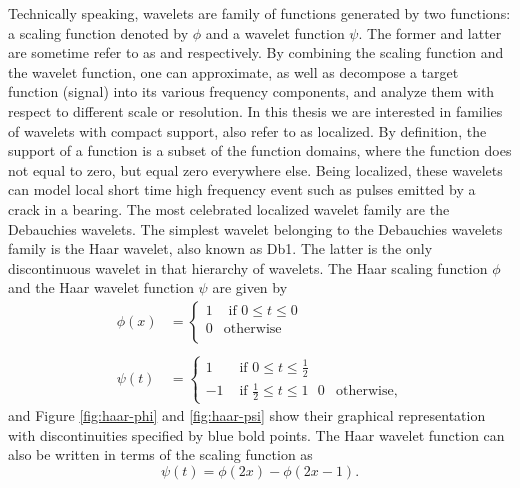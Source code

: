 \documentclass[../Main/thesis.tex]{subfiles}
\begin{document}
\justify
Technically speaking, wavelets are family of functions generated by two functions: a scaling function denoted by $\phi$ and a wavelet function $\psi$. The former and latter are sometime refer to as  and  respectively. By combining the scaling function and the wavelet function, one can approximate, as well as decompose a target function (signal) into its various frequency components, and analyze them with respect to different scale or resolution. In this thesis we are interested in families of wavelets with compact support, also refer to as localized. By definition, the support of a function is a subset of the function domain\´s, where the function does not equal to zero, but equal zero everywhere else. Being localized, these wavelets can model local short time high frequency event such as pulses emitted by a crack in a bearing. The most celebrated localized wavelet family are the Debauchies wavelets. 
\justify
The simplest wavelet belonging to the Debauchies wavelets family is the Haar wavelet, also known as Db1. The latter is the only discontinuous wavelet in that hierarchy of wavelets.
The Haar scaling function $\phi$ and the Haar wavelet function $\psi$ are given by
\begin{equation}\label{eq:haar-wavelet}
\begin{split}
\phi(x) &=
  \begin{cases}
   1 & \text{ if $0 \leq t \le 0$} \\
    0 & \text{otherwise}\\
  \end{cases}\\
  \\
\psi(t)& =
  \begin{cases}
   1 & \text{ if $0 \leq t \le \frac{1}{2}$ } \\
    -1 & \text{ if  $\frac{1}{2} \leq t \le 1$ }
    0 & \text{otherwise},
  \end{cases}
  \end{split}
\end{equation}
and Figure \ref{fig:haar-phi} and \ref{fig:haar-psi} show their graphical representation with discontinuities specified by blue bold points. The Haar wavelet function can also be written in  terms of the scaling function as 
\begin{equation}
\psi(t) = \phi(2x)-\phi(2x-1) \nonumber.
\end{equation}
\end{document}
